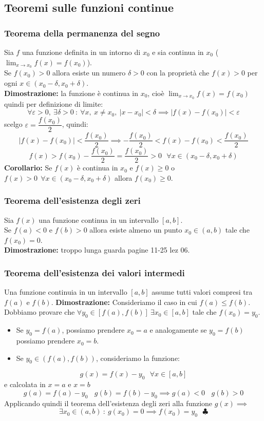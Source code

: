 \documentclass[../../main.tex]{subfiles}
\begin{document}
\subsection{Teoremi sulle funzioni continue}
\subsubsection{Teorema della permanenza del segno}
Sia $f$ una funzione definita in un intorno di $x_0$ e sia continua in $x_0$
($\lim_{x\to x_0} f(x) = f(x_0)$).\\ Se $f(x_0) > 0$ allora esiste un numero
$\delta > 0$ con la proprietà che $f(x) > 0$ per ogni $x\in (x_0 - \delta, x_0
    + \delta)$.\\ \textbf{Dimostrazione:} la funzione è continua in $x_0$, cioè
$\lim_{x\to x_0} f(x) = f(x_0)$ quindi per definizione di limite:
\[
    \forall\varepsilon > 0, \ \exists\delta > 0 \ : \ \forall x, \ x\neq x_0, \ |x-x_0| < \delta \implies |f(x) - f(x_0)| < \varepsilon
\]
scelgo $\varepsilon = \dfrac{f(x_0)}{2}$, quindi:
\[
    |f(x) - f(x_0)| < \frac{f(x_0)}{2} \implies -\frac{f(x_0)}{2} < f(x) - f(x_0) < \frac{f(x_0)}{2}
\]
\[
    f(x) > f(x_0) - \frac{f(x_0)}{2} = \frac{f(x_0)}{2} > 0 \ \ \ \forall x\in (x_0 - \delta, x_0 + \delta)
\]
\textbf{Corollario:} Se $f(x)$ è continua in $x_0$ e $f(x)\geq 0$ o $f(x) > 0 \ \ \forall x\in (x_0 - \delta, x_0 + \delta)$ allora $f(x_0) \geq 0$.

\subsubsection{Teorema dell'esistenza degli zeri}
Sia $f(x)$ una funzione continua in un intervallo $[a, b]$. \\ Se $f(a) < 0$ e
$f(b) > 0$ allora esiste almeno un punto $x_0 \in (a, b)$ tale che $f(x_0) =
    0$.\\ \textbf{Dimostrazione:} troppo lunga guarda pagine 11-25 lez 06.

\subsubsection{Teorema dell'esistenza dei valori intermedi}
Una funzione continuia in un intervallo $[a, b]$ assume tutti valori compresi
tra $f(a)$ e $f(b)$. \textbf{Dimostrazione:} Consideriamo il caso in cui $f(a)
    \leq f(b)$.\\ Dobbiamo provare che $\forall y_0 \in [f(a), f(b)] \ \exists
    x_0\in[a, b]$ tale che $f(x_0) = y_0$.
\begin{itemize}
    \item Se $y_0 = f(a)$, possiamo prendere $x_0 = a$ e analogamente se $y_0 = f(b)$
          possiamo prendere $x_0 = b$.
    \item Se $y_0 \in (f(a), f(b))$, consideriamo la funzione:
\end{itemize}
\[
    g(x) = f(x) - y_0 \ \ \ \forall x\in [a, b]
\]
e calcolata in $x = a$ e $x = b$\\
\[
    g(a) = f(a) - y_0 \ \ \ \ g(b) = f(b) - y_0 \implies g(a) < 0 \ \ \ \ g(b) > 0
\]
Applicando quindi il teorema dell'esistenza degli zeri alla funzione $g(x)
    \implies$
\[
    \exists x_0\in(a,b) \ : \ g(x_0) = 0 \implies f(x_0) = y_0 \ \ \ \clubsuit
\]
\end{document}
